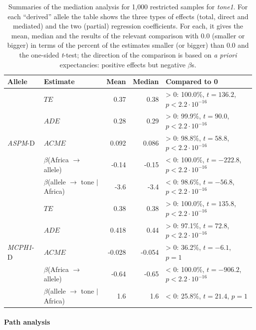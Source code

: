 \documentclass[twoside,onecolumn]{article}
\begin{document}
\begin{table}[h]
  \caption{Summaries of the mediation analysis for 1,000 restricted samples for \textit{tone1}. For each ``derived'' allele the table shows the three types of effects (total, direct and mediated) and the two (partial) regression coefficients. For each, it gives the mean, median and the results of the relevant comparison with 0.0 (smaller or bigger) in terms of the percent of the estimates smaller (or bigger) than 0.0 and the one-sided \textit{t}-test; the direction of the comparison is based on \textit{a priori} expectancies: positive effects but negative $\beta$s.}
  \label{Tab:tone1_mediation_restricted}
  \centering
  \begin{tabular}{|l|l|r|r|l|}
    \toprule
    \textbf{Allele} & \textbf{Estimate} & \textbf{Mean} & \textbf{Median} & \textbf{Compared to 0} \\
    \midrule
    \multirow{5}{*}{\textit{ASPM}-D} & $TE$ & 0.37 & 0.38 & > 0: 100.0\%, $t = 136.2$, $p < 2.2\cdot10^{-16}$ \\
      & $ADE$ & 0.28 & 0.29 & > 0: 99.9\%, $t = 90.0$, $p < 2.2\cdot10^{-16}$ \\
      & $ACME$ & 0.092 & 0.086 & > 0: 98.8\%, $t = 58.8$, $p < 2.2\cdot10^{-16}$ \\
      & $\beta$(Africa $\rightarrow$ allele) & -0.14 & -0.15 & < 0: 100.0\%, $t = -222.8$, $p < 2.2\cdot10^{-16}$ \\
      & $\beta$(allele $\rightarrow$ tone $\mid$ Africa) & -3.6 & -3.4 & < 0: 98.6\%, $t = -56.8$, $p < 2.2\cdot10^{-16}$ \\
    \midrule
    \multirow{5}{*}{\textit{MCPH1}-D} & $TE$ & 0.38 & 0.38 & > 0: 100.0\%, $t = 135.8$, $p < 2.2\cdot10^{-16}$ \\
      & $ADE$ & 0.418 & 0.44 & > 0: 97.1\%, $t = 72.8$, $p < 2.2\cdot10^{-16}$ \\
      & $ACME$ & -0.028 & -0.054 & > 0: 36.2\%, $t = -6.1$, $p = 1$ \\
      & $\beta$(Africa $\rightarrow$ allele) & -0.64 & -0.65 & < 0: 100.0\%, $t = -906.2$, $p < 2.2\cdot10^{-16}$ \\
      & $\beta$(allele $\rightarrow$ tone $\mid$ Africa) & 1.6 & 1.6 & < 0: 25.8\%, $t = 21.4$, $p = 1$ \\
    \bottomrule
  \end{tabular}
\end{table}


\paragraph{Path analysis}
\end{document}
